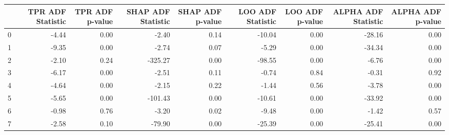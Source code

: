 \begin{tabular}{lrrrrrrrr}
\toprule
 & TPR ADF Statistic & TPR ADF p-value & SHAP ADF Statistic & SHAP ADF p-value & LOO ADF Statistic & LOO ADF p-value & ALPHA ADF Statistic & ALPHA ADF p-value \\
\midrule
0 & -4.44 & 0.00 & -2.40 & 0.14 & -10.04 & 0.00 & -28.16 & 0.00 \\
1 & -9.35 & 0.00 & -2.74 & 0.07 & -5.29 & 0.00 & -34.34 & 0.00 \\
2 & -2.10 & 0.24 & -325.27 & 0.00 & -98.55 & 0.00 & -6.76 & 0.00 \\
3 & -6.17 & 0.00 & -2.51 & 0.11 & -0.74 & 0.84 & -0.31 & 0.92 \\
4 & -4.64 & 0.00 & -2.15 & 0.22 & -1.44 & 0.56 & -3.78 & 0.00 \\
5 & -5.65 & 0.00 & -101.43 & 0.00 & -10.61 & 0.00 & -33.92 & 0.00 \\
6 & -0.98 & 0.76 & -3.20 & 0.02 & -9.48 & 0.00 & -1.42 & 0.57 \\
7 & -2.58 & 0.10 & -79.90 & 0.00 & -25.39 & 0.00 & -25.41 & 0.00 \\
\bottomrule
\end{tabular}
